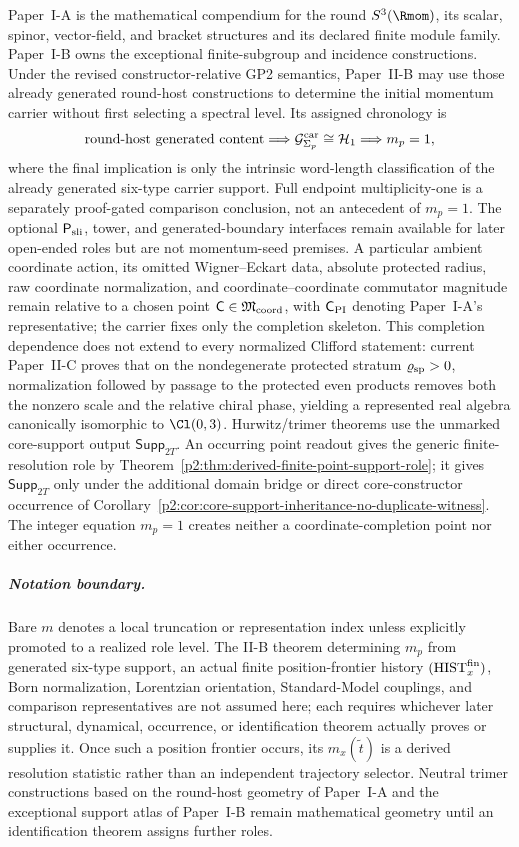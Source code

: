 \documentclass[12pt,a4paper]{article}
\begin{document}
Paper~I-A is the mathematical compendium for the round
\(S^3(\Rmom)\), its scalar, spinor, vector-field, and bracket
structures and its declared finite module family. Paper~I-B
owns the exceptional finite-subgroup and incidence constructions.  Under the revised constructor-relative GP2
semantics, Paper~II-B may use those already generated round-host constructions
to determine the initial momentum carrier without first selecting a spectral
level.  Its assigned chronology is
\[
   \text{round-host generated content}
   \Longrightarrow \mathcal G^{\rm car}_{\Sigma_p}\cong\mathcal H_1
   \Longrightarrow m_p=1,
\]
where the final implication is only the intrinsic word-length classification
of the already generated six-type carrier support.  Full endpoint multiplicity-one
is a separately proof-gated comparison conclusion, not an antecedent of
\(m_p=1\).  The optional \(\mathsf P_{\rm sli}\), tower,
and generated-boundary interfaces remain available for later open-ended roles
but are not momentum-seed premises.  A particular ambient coordinate action,
its omitted Wigner--Eckart data, absolute protected radius, raw coordinate
normalization, and coordinate--coordinate commutator magnitude remain relative
to a chosen point \(\mathsf C\in\mathfrak M_{\rm coord}\), with
\(\mathsf C_{\rm PI}\) denoting Paper~I-A's representative; the carrier fixes
only the completion skeleton.  This completion dependence does not extend to
every normalized Clifford statement: current Paper~II-C proves that on the
nondegenerate protected stratum \(\varrho_{\rm sp}>0\), normalization followed
by passage to the protected even products removes both the nonzero scale and
the relative chiral phase, yielding a represented real algebra canonically
isomorphic to \(\Cl(0,3)\).  Hurwitz/trimer theorems use the unmarked
core-support output \(\mathsf{Supp}_{2T}\).  An occurring point readout gives
the generic finite-resolution role by
Theorem~\ref{p2:thm:derived-finite-point-support-role}; it gives
\(\mathsf{Supp}_{2T}\) only under the additional domain bridge or direct
core-constructor occurrence of
Corollary~\ref{p2:cor:core-support-inheritance-no-duplicate-witness}.  The
integer equation \(m_p=1\) creates neither a coordinate-completion point nor
either occurrence.

\subparagraph{Notation boundary.}
Bare \(m\) denotes a local truncation or representation index unless explicitly
promoted to a realized role level.  The II-B theorem determining \(m_p\) from generated six-type support, an
actual finite position-frontier history \((\mathrm{HIST}_x^{\rm fin})\), Born
normalization, Lorentzian orientation, Standard-Model couplings, and comparison
representatives are not assumed here; each requires whichever later
structural, dynamical, occurrence, or identification theorem actually proves
or supplies it.  Once such a position frontier occurs, its
\(m_x(\tilde t)\) is a derived resolution statistic rather than an independent
trajectory selector.  Neutral trimer constructions based on the round-host geometry of
Paper~I-A and the exceptional support atlas of Paper~I-B remain
mathematical geometry until an identification theorem assigns further roles.
\end{document}
